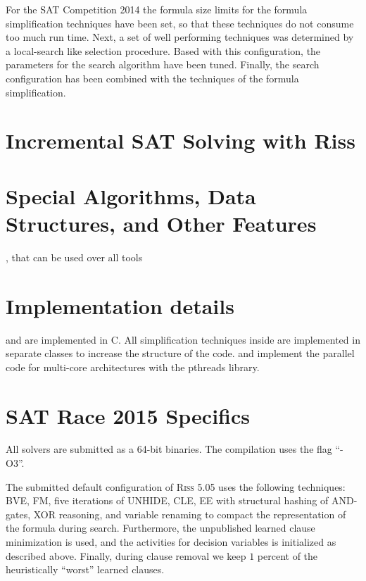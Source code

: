 \documentclass[conference]{IEEEtran}
\def\CC{{C\nolinebreak[4]\hspace{-.05em}\raisebox{.4ex}{\tiny\bf ++}}}
\begin{document}
For the SAT Competition 2014 the formula size limits for the formula simplification techniques have been set, so that these techniques do not consume too much run time.
Next, a set of well performing techniques was determined by a local-search like selection procedure. 
Based with this configuration, the parameters for the search algorithm have been tuned. 
Finally, the search configuration has been combined with the techniques of the formula simplification. 

\section{Incremental SAT Solving with Riss}


\section{Special Algorithms, Data Structures, and Other Features}

, that can be used over all tools


\section{Implementation details}

\riss and \coprocessor are implemented in \CC. 
All simplification techniques inside \coprocessor are implemented in separate classes to increase the structure of the code. 
\priss and \pcasso implement the parallel code for multi-core architectures with the pthreads library.
 
\section{SAT Race 2015 Specifics}

All solvers are submitted as a 64-bit binaries. 
The compilation uses the flag ``-O3''. 

The submitted default configuration of \textsc{Riss 5.05} uses the following techniques:
%
BVE, 
FM, 
five iterations of UNHIDE,
CLE,
EE with structural hashing of AND-gates,
XOR reasoning, 
and variable renaming to compact the representation of the formula during search. 
Furthermore, the unpublished learned clause minimization is used, and the activities for decision variables is initialized as described above. 
Finally, during clause removal we keep $1$ percent of the heuristically ``worst'' learned clauses.
\end{document}
